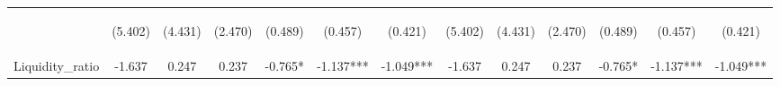 \documentclass[]{article}
\begin{document}
\begin{center}
\begin{tabular}{lcccccccccccc}
\vspace{4pt} & \begin{footnotesize}(5.402)\end{footnotesize} & \begin{footnotesize}(4.431)\end{footnotesize} & \begin{footnotesize}(2.470)\end{footnotesize} & \begin{footnotesize}(0.489)\end{footnotesize} & \begin{footnotesize}(0.457)\end{footnotesize} & \begin{footnotesize}(0.421)\end{footnotesize} & \begin{footnotesize}(5.402)\end{footnotesize} & \begin{footnotesize}(4.431)\end{footnotesize} & \begin{footnotesize}(2.470)\end{footnotesize} & \begin{footnotesize}(0.489)\end{footnotesize} & \begin{footnotesize}(0.457)\end{footnotesize} & \begin{footnotesize}(0.421)\end{footnotesize} \\
Liquidity\_ratio & -1.637 & 0.247 & 0.237 & -0.765* & -1.137*** & -1.049*** & -1.637 & 0.247 & 0.237 & -0.765* & -1.137*** & -1.049*** \\

\end{tabular}
\end{center}
\end{document}
